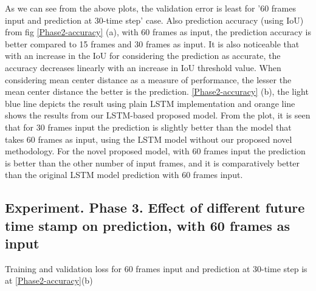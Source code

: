 




As we can see from the above plots, the validation error is least for '60 frames input and prediction at 30-time step' case. Also prediction accuracy (using IoU) from fig \ref{Phase2-accuracy} (a), with 60 frames as input, the prediction accuracy is better compared to 15 frames and 30 frames as input. It is also noticeable that with an increase in the IoU for considering the prediction as accurate, the accuracy decreases linearly with an increase in IoU threshold value. When considering mean center distance as a measure of performance, the lesser the mean center distance the better is the prediction.
\ref{Phase2-accuracy} (b), the light blue line depicts the result using plain LSTM implementation and orange line shows the results from our LSTM-based proposed model. From the plot, it is seen that for 30 frames input the prediction is slightly better than the model that takes 60 frames as input, using the LSTM model without our proposed novel methodology. For the novel proposed model, with 60 frames input the prediction is better than the other number of input frames, and it is comparatively better than the original LSTM model prediction with 60 frames input.

\subsection{Experiment. Phase 3. Effect of different future time stamp on prediction, with 60 frames as input}
Training and validation loss for 60 frames input and prediction at 30-time step is at \ref{Phase2-accuracy}(b)

